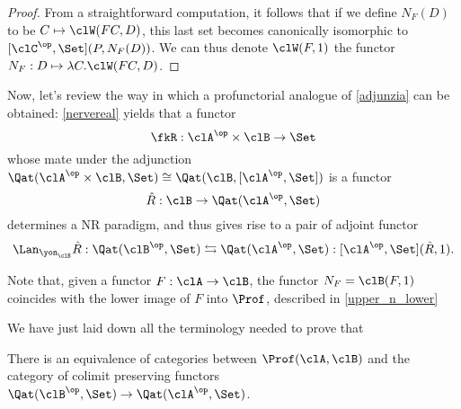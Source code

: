 \begin{proof}
	From a straightforward computation, it follows that if we define $N_F(D)$ to be $C\mapsto \clW(F C,D)$, this last set becomes canonically isomorphic to $[\clC^\op,\Set](P,N_F(D))$. We can thus denote $\clW(F,1)$ the functor $N_F : D\mapsto \lambda C.\clW(F C,D)$.
\end{proof}
Now, let's review the way in which a profunctorial analogue of \eqref{adjunzia} can be obtained: \autoref{nervereal} yields that a functor
\[ \fkR : \clA^\op\times \clB \to \Set \]
whose mate under the adjunction $\Qat(\clA^\op\times \clB ,\Set)\cong\Qat(\clB,[\clA^\op,\Set])$ is a functor
\[ \hat R : \clB \to \Qat(\clA^\op,\Set) \]
determines a NR paradigm, and thus gives rise to a pair of adjoint functor
\[ \Lan_{\yon_\clB} \hat R : \Qat(\clB^\op,\Set) \leftrightarrows \Qat(\clA^\op,\Set) : [\clA^\op,\Set](\hat R,1). \]
\begin{remark}\label{ciu}
	Note that, given a functor $F : \clA \to \clB$, the functor $N_F =\clB(F,1)$ coincides with the lower image of $F$ into $\Prof$, described in \autoref{upper_n_lower}
\end{remark}
We have just laid down all the terminology needed to prove that
\begin{proposition}\label{equ_prof_cocont}
	There is an equivalence of categories between $\Prof(\clA,\clB)$ and the category of colimit preserving functors $\Qat(\clB^\op,\Set) \to \Qat(\clA^\op,\Set)$.
\end{proposition}
